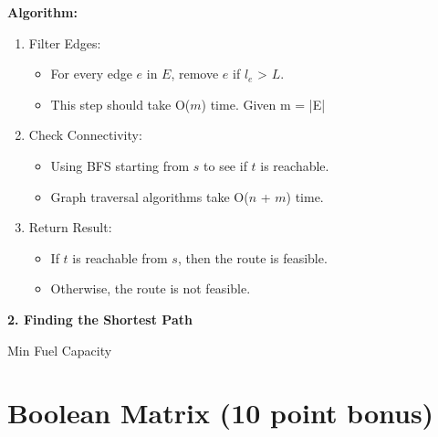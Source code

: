 \documentclass{article}[12pt]
\begin{document}
  \textbf{Algorithm:}
  \begin{enumerate}
    \item Filter Edges:
      \begin{itemize}
        \item For every edge $e$ in $E$, remove $e$ if $l_e$ > $L$.
        \item This step should take O($m$) time. Given m = |E|
      \end{itemize}
    \item Check Connectivity:
      \begin{itemize}
        \item Using BFS starting from $s$ to see if $t$ is reachable.
        \item Graph traversal algorithms take O($n$ + $m$) time.
      \end{itemize}
    \item Return Result:
      \begin{itemize}
        \item If $t$ is reachable from $s$, then the route is feasible.
        \item Otherwise, the route is not feasible.
      \end{itemize}
  \end{enumerate}

  \textbf{2. Finding the Shortest Path}\\


\begin{algorithm}[H]
\caption{Min Fuel Capacity}

\end{algorithm}

\newpage
\section{Boolean Matrix (10 point bonus)}
\end{document}
